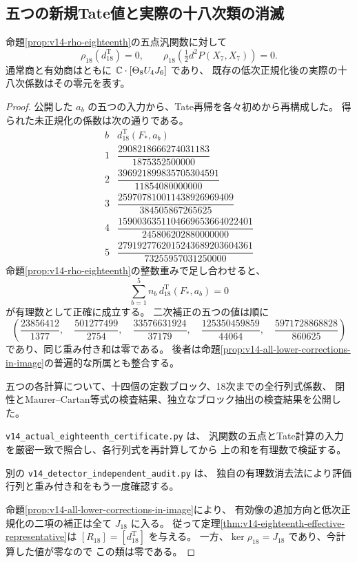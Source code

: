 \subsection{五つの新規Tate値と実際の十八次類の消滅}

\begin{proposition}[実際の十八次類は零である]
\label{prop:v14-actual-eighteenth-class}
命題\ref{prop:v14-rho-eighteenth}の五点汎関数に対して
\[
 \rho_{18}(d^{\mathrm T}_{18})=0,\qquad
 \rho_{18}\left(\tfrac12d^2P(X_7,X_7)\right)=0.
\]
通常商と有効商はともに $\mathbb C\cdot[\Theta_8U_4J_6]$ であり、
既存の低次正規化後の実際の十八次係数はその零元を表す。
\end{proposition}

\begin{proof}
公開した $a_b$ の五つの入力から、Tate再帰を各々初めから再構成した。
得られた未正規化の係数は次の通りである。
\[
\begin{array}{c|c}
b&d^{\mathrm T}_{18}(F_*,a_b)\\\hline
1&\dfrac{2908218666274031183}{1875352500000}\\[0.7em]
2&\dfrac{396921899835705304591}{11854080000000}\\[0.7em]
3&\dfrac{259707810011438926969409}{384505867265625}\\[0.7em]
4&\dfrac{1590036351104669653664022401}{245806202880000000}\\[0.7em]
5&\dfrac{2791927762015243689203604361}{73255957031250000}
\end{array}
\]
命題\ref{prop:v14-rho-eighteenth}の整数重みで足し合わせると、
\[
 \sum_{b=1}^5 n_b\,d^{\mathrm T}_{18}(F_*,a_b)=0
\]
が有理数として正確に成立する。
二次補正の五つの値は順に
\[
 \left(
 \frac{23856412}{1377},\quad
 \frac{501277499}{2754},\quad
 \frac{33576631924}{37179},\quad
 \frac{125350459859}{44064},\quad
 \frac{5971728868828}{860625}
 \right)
\]
であり、同じ重み付き和は零である。
後者は命題\ref{prop:v14-all-lower-corrections-in-image}の普遍的な所属とも整合する。

五つの各計算について、十四個の定数ブロック、18次までの全行列式係数、
閉性とMaurer--Cartan等式の検査結果、独立なブロック抽出の検査結果を公開した。

\texttt{v14\_actual\_eighteenth\_certificate.py} は、
汎関数の五点とTate計算の入力を厳密一致で照合し、各行列式を再計算してから
上の和を有理数で検証する。

別の \texttt{v14\_detector\_independent\_audit.py} は、
独自の有理数消去法により評価行列と重み付き和をもう一度確認する。

命題\ref{prop:v14-all-lower-corrections-in-image}により、
有効像の追加方向と低次正規化の二項の補正は全て $J_{18}$ に入る。
従って定理\ref{thm:v14-eighteenth-effective-representative}は
$[R_{18}]=[d^{\mathrm T}_{18}]$ を与える。
一方、$\ker\rho_{18}=J_{18}$ であり、今計算した値が零なので
この類は零である。
\end{proof}

